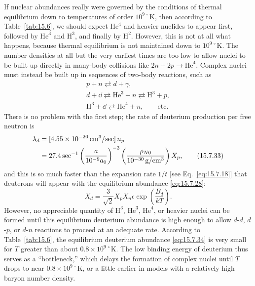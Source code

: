 If nuclear abundances really were governed by the conditions of thermal
equilibrium down to temperatures of order \(10^{9\,\circ}\mathrm K\), then
according to Table~\ref{tab:15.6}, we should expect \(\mathrm{He}^4\) and
heavier nuclides to appear first, followed by \(\mathrm{He}^3\) and
\(\mathrm H^3\), and finally by \(\mathrm H^2\). However, this is not at all
what happens, because thermal equilibrium is not maintained down to
\(10^{9\,\circ}\mathrm K\). The number densities at all but the very earliest
times are too low to allow nuclei to be built up directly in many-body
collisions like \(2n+2p\to\mathrm{He}^4\). Complex nuclei must instead be
built up in sequences of two-body reactions, such as
\begin{equation}
  \begin{gathered}
    p+n\rightleftarrows d+\gamma,
    \\
    d+\dd\rightleftarrows\mathrm{He}^3+n
    \rightleftarrows\mathrm H^3+p,
    \\
    \mathrm H^3+\dd\rightleftarrows\mathrm{He}^4+n,
    \qquad\text{etc.}
  \end{gathered}
  \tag{15.7.32}\label{eq:15.7.32}
\end{equation}
There is no problem with the first step; the rate of deuterium production per
free neutron is
\begin{align}
  \lambda_d
  &=
  [4.55\times10^{-20}\,\mathrm{cm^3/sec}]\,n_p
  \notag\\
  &=
  27.4\,\mathrm{sec}^{-1}
  \left(
    \frac{a}{10^{-9}a_0}
  \right)^{-3}
  \left(
    \frac{\rho_{N0}}{10^{-30}\,\mathrm{g/cm^3}}
  \right)X_p,
  \tag{15.7.33}\label{eq:15.7.33}
\end{align}
and this is so much faster than the expansion rate \(1/t\) [see
Eq.~\eqref{eq:15.7.18}] that deuterons will appear with the equilibrium
abundance \eqref{eq:15.7.28}:
\begin{equation}
  X_d
  =
  \frac{3}{\sqrt2}X_pX_n\epsilon
  \exp\left(\frac{B_d}{kT}\right).
  \tag{15.7.34}\label{eq:15.7.34}
\end{equation}
However, no appreciable quantity of \(\mathrm H^3\), \(\mathrm{He}^3\),
\(\mathrm{He}^4\), or heavier nuclei can be formed until this equilibrium
deuterium abundance is high enough to allow \(d\)-\(d\), \(d\)-\(p\), or
\(d\)-\(n\) reactions to proceed at an adequate rate. According to
Table~\ref{tab:15.6}, the equilibrium deuterium abundance
\eqref{eq:15.7.34} is very small for \(T\) greater than about
\(0.8\times10^{9\,\circ}\mathrm K\). The low binding energy of deuterium
thus serves as a ``bottleneck,'' which delays the formation of complex nuclei
until \(T\) drops to near \(0.8\times10^{9\,\circ}\mathrm K\), or a little
earlier in models with a relatively high baryon number density.

